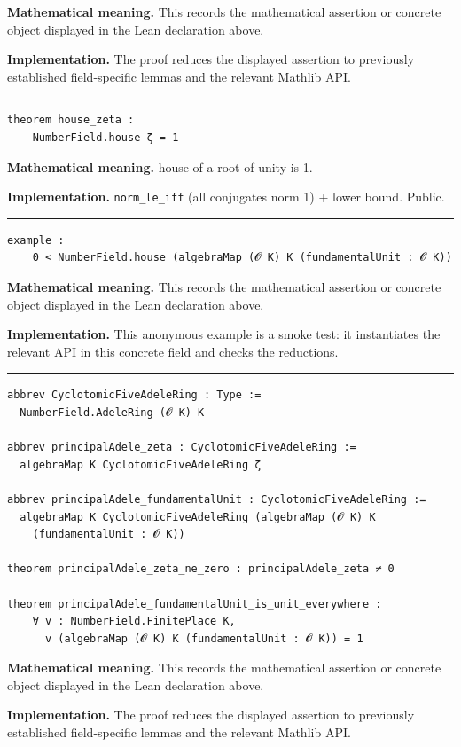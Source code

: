 \documentclass[UTF8,a4paper,11pt,fontset=fandol]{ctexart}
\theoremstyle{definition}
\newcommand{\statementsep}{\par\medskip\hrule\medskip}
\begin{document}
\noindent\textbf{Mathematical meaning.} This records the mathematical assertion or concrete object displayed in the Lean declaration above.\par
\noindent\textbf{Implementation.} The proof reduces the displayed assertion to previously established field-specific lemmas and the relevant Mathlib API.\par
\statementsep
\begin{verbatim}
theorem house_zeta :
    NumberField.house ζ = 1
\end{verbatim}
\noindent\textbf{Mathematical meaning.} house of a root of unity is 1.\par
\noindent\textbf{Implementation.} \texttt{norm\_\allowbreak{}le\_\allowbreak{}iff} (all conjugates norm 1) + lower bound. Public.\par
\statementsep
\begin{verbatim}
example :
    0 < NumberField.house (algebraMap (𝓞 K) K (fundamentalUnit : 𝓞 K))
\end{verbatim}
\noindent\textbf{Mathematical meaning.} This records the mathematical assertion or concrete object displayed in the Lean declaration above.\par
\noindent\textbf{Implementation.} This anonymous example is a smoke test: it instantiates the relevant API in this concrete field and checks the reductions.\par
\statementsep
\begin{verbatim}
abbrev CyclotomicFiveAdeleRing : Type :=
  NumberField.AdeleRing (𝓞 K) K

abbrev principalAdele_zeta : CyclotomicFiveAdeleRing :=
  algebraMap K CyclotomicFiveAdeleRing ζ

abbrev principalAdele_fundamentalUnit : CyclotomicFiveAdeleRing :=
  algebraMap K CyclotomicFiveAdeleRing (algebraMap (𝓞 K) K
    (fundamentalUnit : 𝓞 K))

theorem principalAdele_zeta_ne_zero : principalAdele_zeta ≠ 0

theorem principalAdele_fundamentalUnit_is_unit_everywhere :
    ∀ v : NumberField.FinitePlace K,
      v (algebraMap (𝓞 K) K (fundamentalUnit : 𝓞 K)) = 1
\end{verbatim}
\noindent\textbf{Mathematical meaning.} This records the mathematical assertion or concrete object displayed in the Lean declaration above.\par
\noindent\textbf{Implementation.} The proof reduces the displayed assertion to previously established field-specific lemmas and the relevant Mathlib API.\par
\end{document}
